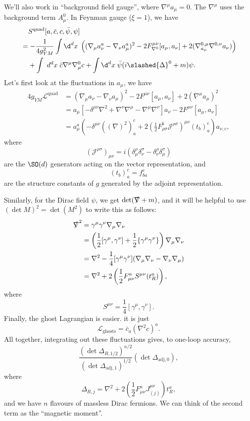 \documentclass[a4paper]{article}
\begin{document}
We'll also work in ``background field gauge'', where $\nabla^\mu a_\mu = 0$. The $\nabla^\mu$ uses the background term $A_\mu^0$. In Feynman gauge ($\xi = 1$), we have
\begin{align*}
  &\phantom{={}}S^{\mathrm{quad}} [a, \bar{c}, c, \bar\psi, \psi]\\
  &= - \frac{1}{4 g_{YM}^2} \int \d^d x\; \left((\nabla_\mu a_\nu^a - \nabla_\nu a_\mu^a)^2 - 2 F_{\nabla^0}^{\mu\nu} [a_\mu, a_\nu] + 2 (\nabla^{0, \mu}_{a_\mu} \nabla^{0, \nu} a_\nu)\right) \\
  &\hphantom{={}}+ \int\ d^d x\; \bar{c} \nabla^\mu \nabla_\mu^0 c + \int \d^d x\; \bar\psi (i \slashed{\Delta}^0 + m)\psi.
\end{align*}
Let's first look at the fluctuations in $a_\mu$, we have %
\begin{align*}
  4g_{YM} \mathcal{L}^{\mathrm{quad}} &= (\nabla_\mu a_\nu - \nabla_\nu a_\mu)^2 - 2F^{\mu\nu} [a_\mu, a_\nu] + 2 (\nabla^\mu a_\mu)^2\\
  &= a_\mu \left[-\delta^{\mu\nu} \nabla^2 + \nabla^\nu \nabla^\mu - \nabla^\mu \nabla^\nu \right] a_\nu - 2 F^{\mu\nu} [a_\mu, a_\nu]\\
  &= a_\mu^a \left(- \delta^{\mu\nu} ((\nabla)^2)^c_a + 2 \left(\frac{1}{2} F_{\rho\sigma}^b \mathcal{J}^{\rho\sigma}\right)^{\mu\nu} (t_b)^c_a\right) a_{\nu, c},
\end{align*}
where
\[
  (\mathcal{J}^{\rho\sigma})_{\mu\nu} = i \left(\delta^\rho_\mu \delta^\sigma_\nu - \delta^\rho_\nu \delta^\sigma_\mu\right)
\]
are the $\SO(d)$ generators acting on the vector representation, and
\[
  (t_b)^c_a = f^c_{ba}
\]
are the structure constants of $g$ generated by the adjoint representation.

Similarly, for the Dirac field $\psi$, we get $\det(\slashed{\nabla} + m)$, and it will be helpful to use $(\det M)^2 = \det (M^2)$ to write this as follows:
\begin{align*}
  \slashed{\nabla}^2 &= \gamma^\mu \gamma^\nu \nabla_\mu \nabla_\nu \\
  &= \left(\frac{1}{2} [\gamma^\mu, \gamma^\nu] + \frac{1}{2} \{\gamma^\mu \gamma^\nu\}\right) \nabla_\mu \nabla_\nu\\
  &= \nabla^2 - \frac{1}{4} [\gamma^\mu \gamma^\nu] (\nabla_\mu \nabla_\nu - \nabla_\nu \nabla_\mu)\\
  &= \nabla^2 + 2\left(\frac{1}{2} F_{\mu\nu}^a S^{\mu\nu} (t^a_R)\right),
\end{align*}
where
\[
  S^{\mu\nu} = \frac{1}{4} [\gamma^\mu, \gamma^\nu].
\]
Finally, the ghost Lagrangian is easier. it is just
\[
  \mathcal{L}_{\mathrm{ghosts}} = \bar{c}_a (\nabla^2 c)^a.
\]
All together, integrating out these fluctuations gives, to one-loop accuracy,
\[
  \frac{(\det \Delta_{R, 1/2})^{n/2}}{ (\det \Delta_{\mathrm{adj}, 1})^{1/2}} (\det \Delta_{\mathrm{adj}, 0}),
\]
where
\[ %
  \Delta_{R, j} = \nabla^2 + 2\left(\frac{1}{2} F_{\mu\nu}^a J^{\mu\nu}_{(j)}\right)t^a_R,
\]
and we have $n$ flavours of massless Dirac fermions. We can think of the second term as the ``magnetic moment''.
\end{document}
